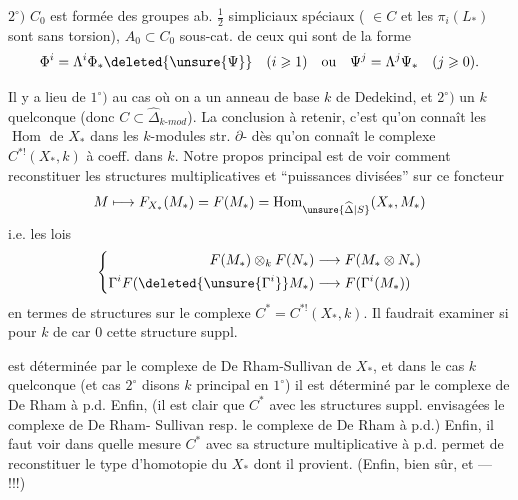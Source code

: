 $2^\circ)$ $C_0$  est formée des groupes ab.
$\frac12$ simpliciaux  spéciaux
( $\in C$ et les $\pi_i(L_*)$ sont
sans torsion), $A_0\subset C_0$ sous-cat.
de ceux qui sont de la forme
\[
\Phi^i=\Lambda^i\Phi_*\deleted{\unsure{\Psi}}\quad(i\geqslant1)
\quad\text{ou}\quad\Psi^j=\Lambda^j\Psi_*\quad(j\geqslant0).
\]

Il y a lieu de 
$1^\circ)$ au cas où on a un anneau
de base $k$ de Dedekind,
et $2^\circ)$ un $k$ quelconque 
(donc $C\subset\widehat\Delta_{k\text{-}mod}$). La 
conclusion à retenir, c'est
qu'on connaît les $\operatorname{Hom}$ de
$X_*$ dans les $k$-modules str.
$\partial$-  dès qu'on connaît
le complexe  $C^{*!}(X_*,k)$ à coeff. dans
$k$. Notre propos principal
est de voir comment reconstituer
les structures multiplicatives
et ``puissances divisées'' sur ce
foncteur
\[
M\longmapsto F_{X_*}(M_*)=F(M_*)=\operatorname{Hom}_{\unsure{\widehat\Delta|S}}(X_*,M_*)
\]
i.e. les lois
\[
\left\{\begin{aligned}
F(M_*)\otimes_k F(N_*)&\longrightarrow F(M_*\otimes N_*)\\
\Gamma^iF(\deleted{\unsure{\Gamma^i}}M_*)&\longrightarrow F(\Gamma^i(M_*))
\end{aligned}\right.
\]
en termes de  structures
sur le complexe  $C^*=C^{*!}(X_*,k)$.
Il faudrait examiner si pour
$k$ de car $0$  cette structure suppl.

est déterminée par le complexe de
De Rham-Sullivan de $X_*$, et dans
le cas $k$ quelconque (et cas $2^\circ$ disons
$k$ principal en  $1^\circ$) il est
déterminé par le complexe de
De Rham à p.d. Enfin,
 (il est clair que $C^*$
avec les structures suppl. envisagées
 le complexe de De Rham-
Sullivan resp. le complexe de
De Rham à p.d.) Enfin, il
faut voir dans quelle mesure $C^*$
avec sa structure multiplicative
à p.d. permet de reconstituer le
type d'homotopie du $X_*$ dont
il provient. (Enfin, bien sûr,
 et  --- !!!)

